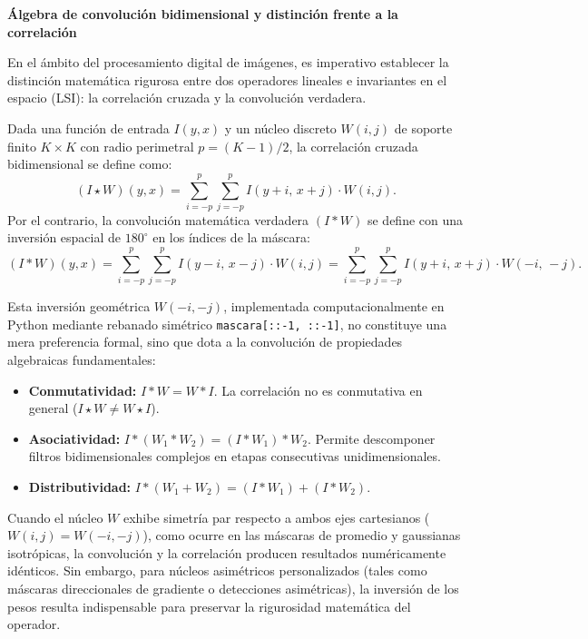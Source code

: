 \documentclass[11pt]{article}
\begin{document}
\textbf{Álgebra de convolución bidimensional y distinción frente a la correlación}

En el ámbito del procesamiento digital de imágenes, es imperativo establecer la distinción matemática rigurosa entre dos operadores lineales e invariantes en el espacio (LSI): la correlación cruzada y la convolución verdadera.

Dada una función de entrada $I(y, x)$ y un núcleo discreto $W(i, j)$ de soporte finito $K \times K$ con radio perimetral $p = (K-1)/2$, la correlación cruzada bidimensional se define como:
\begin{equation}
(I \star W)(y, x) = \sum_{i=-p}^{p} \sum_{j=-p}^{p} I(y + i, \, x + j) \cdot W(i, j).
\end{equation}
Por el contrario, la convolución matemática verdadera $(I * W)$ se define con una inversión espacial de $180^\circ$ en los índices de la máscara:
\begin{equation}
(I * W)(y, x) = \sum_{i=-p}^{p} \sum_{j=-p}^{p} I(y - i, \, x - j) \cdot W(i, j) = \sum_{i=-p}^{p} \sum_{j=-p}^{p} I(y + i, \, x + j) \cdot W(-i, \, -j).
\end{equation}

Esta inversión geométrica $W(-i, -j)$, implementada computacionalmente en Python mediante rebanado simétrico \texttt{mascara[::-1, ::-1]}, no constituye una mera preferencia formal, sino que dota a la convolución de propiedades algebraicas fundamentales:
\begin{itemize}[itemsep=0.2em]
\item \textbf{Conmutatividad:} $I * W = W * I$. La correlación no es conmutativa en general ($I \star W \ne W \star I$).
\item \textbf{Asociatividad:} $I * (W_1 * W_2) = (I * W_1) * W_2$. Permite descomponer filtros bidimensionales complejos en etapas consecutivas unidimensionales.
\item \textbf{Distributividad:} $I * (W_1 + W_2) = (I * W_1) + (I * W_2)$.
\end{itemize}

Cuando el núcleo $W$ exhibe simetría par respecto a ambos ejes cartesianos ($W(i, j) = W(-i, -j)$), como ocurre en las máscaras de promedio y gaussianas isotrópicas, la convolución y la correlación producen resultados numéricamente idénticos. Sin embargo, para núcleos asimétricos personalizados (tales como máscaras direccionales de gradiente o detecciones asimétricas), la inversión de los pesos resulta indispensable para preservar la rigurosidad matemática del operador.
\end{document}
